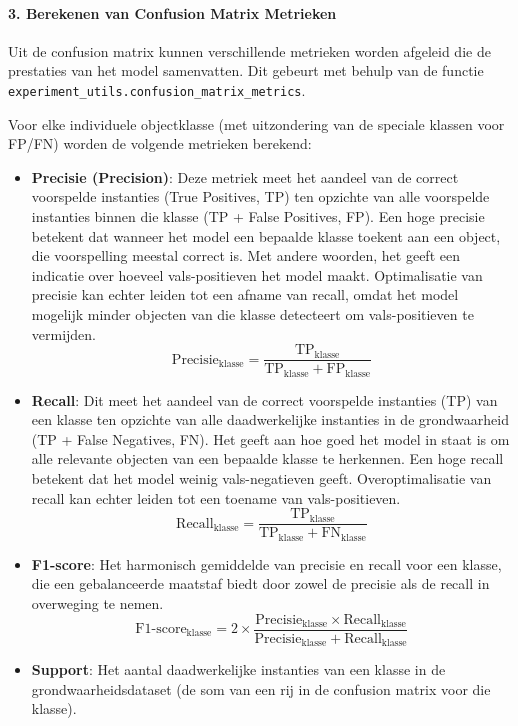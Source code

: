 \paragraph{3. Berekenen van Confusion Matrix Metrieken}
Uit de confusion matrix kunnen verschillende metrieken worden afgeleid die de prestaties van het model samenvatten.
Dit gebeurt met behulp van de functie \texttt{experiment\_utils.confusion\_matrix\_metrics}. 

Voor elke individuele objectklasse (met uitzondering van de speciale klassen voor FP/FN) worden de volgende metrieken berekend:
\begin{itemize}
    \item \textbf{Precisie (Precision)}: Deze metriek meet het aandeel van de correct voorspel\-de instanties (True Positives, TP) 
        ten opzichte van alle voorspelde instanties binnen die klasse (TP + False Positives, FP). 
        Een hoge precisie betekent dat wanneer het model een bepaalde klasse toekent aan een object, die voorspelling meestal correct is. 
        Met andere woorden, het geeft een indicatie over hoeveel vals-positieven het model maakt. 
        Optimalisatie van precisie kan echter leiden tot een afname van recall,
        omdat het model mogelijk minder objecten van die klasse detecteert om vals-positieven te vermijden.
        \[
        \text{Precisie}_{\text{klasse}} = \frac{\text{TP}_{\text{klasse}}}{\text{TP}_{\text{klasse}} + \text{FP}_{\text{klasse}}}
        \]
    \item \textbf{Recall}: Dit meet het aandeel van de correct voorspelde instanties (TP) 
        van een klasse ten opzichte van alle daadwerkelijke instanties in de grondwaarheid (TP + False Negatives, FN). 
        Het geeft aan hoe goed het model in staat is om alle relevante objecten van een bepaalde klasse te herkennen.
        Een hoge recall betekent dat het model weinig vals-negatieven geeft.
        Overoptimalisatie van recall kan echter leiden tot een toename van vals-positieven.
        \[
        \text{Recall}_{\text{klasse}} = \frac{\text{TP}_{\text{klasse}}}{\text{TP}_{\text{klasse}} + \text{FN}_{\text{klasse}}}
        \]
    \item \textbf{F1-score}: Het harmonisch gemiddelde van precisie en recall voor een klasse, 
    die een gebalanceerde maatstaf biedt door zowel de precisie als de recall in overweging te nemen.
    \[
    \text{F1-score}_{\text{klasse}} = 2 \times \frac{\text{Precisie}_{\text{klasse}} \times \text{Recall}_{\text{klasse}}}{\text{Precisie}_{\text{klasse}} + \text{Recall}_{\text{klasse}}}
    \]
    \item \textbf{Support}: Het aantal daadwerkelijke instanties van een klasse in de grondwaarheidsdataset (de som van een rij in de confusion matrix voor die klasse).
\end{itemize}


